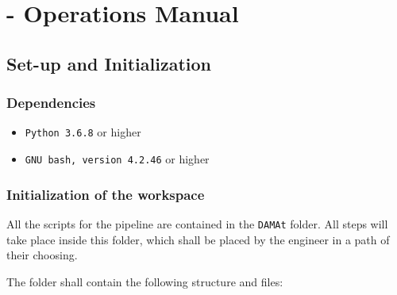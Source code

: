 
\chapter{\DAMA - Operations Manual}
\label{chapter:dama:operations}

\section{Set-up and Initialization}
\label{sec:dama_setup}
\subsection{Dependencies}

\begin{itemize}
	\item \texttt{Python 3.6.8} or higher
	\item \texttt{GNU bash, version 4.2.46} or higher
\end{itemize}

\subsection{Initialization of the \DAMA workspace}

All the scripts for the \DAMA pipeline are contained in the \texttt{DAMAt} folder.
All \DAMA steps will take place inside this folder, which shall be placed by the engineer in a path of their choosing.

The folder shall contain the following structure and files:

